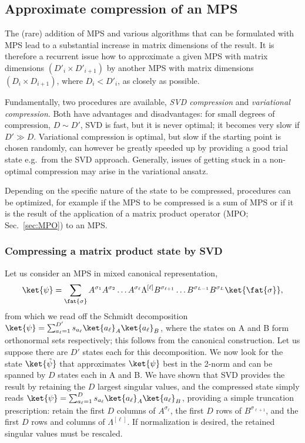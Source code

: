\subsection{Approximate compression of an MPS}

The (rare) addition of MPS and various algorithms that can be formulated with MPS lead to a substantial increase in matrix dimensions of the result. It is therefore a recurrent issue how to approximate a given MPS with matrix dimensions $(D'_i \times D'_{i+1})$ by another MPS with 
matrix dimensions $(D_i \times D_{i+1})$, where $D_i < D'_i$, as closely as possible. 

Fundamentally, two procedures are available, {\em SVD compression} and {\em variational compression}. Both have advantages and disadvantages: for small degrees of compression, $D \sim D'$, SVD is fast, but it is never optimal; it becomes very slow if $D' \gg D$. Variational compression is optimal, but slow if the starting point is chosen randomly, can however be greatly speeded up by providing a good trial state e.g.\ from the SVD approach. Generally, issues of getting stuck in a non-optimal compression may arise in the variational ansatz.
 
Depending on the specific nature of the state to be compressed, procedures can be optimized, for example if the MPS to be compressed is a sum of MPS or if it is the result of the application of a matrix product operator (MPO; Sec.\ \ref{sec:MPO}) to an MPS.

\subsubsection{Compressing a matrix product state by SVD}
Let us consider an MPS in mixed canonical representation,
\begin{equation}
\ket{\psi} = \sum_{\fat{\sigma}} A^{\sigma_1} A^{\sigma_2} \ldots A^{\sigma_{\ell}} \Lambda^{[\ell]} B^{\sigma_{\ell+1}} \ldots B^{\sigma_{L-1}} B^{\sigma_L}  \ket{\fat{\sigma}} ,
\label{eq:compressionstart}
\end{equation}
from which we read off the Schmidt decomposition $\ket{\psi} = \sum_{a_\ell=1}^{D'} s_{a_\ell} \ket{a_\ell}_A \ket{a_\ell}_B$, where the states on A and B form orthonormal sets respectively; this follows from the canonical construction. Let us suppose there are $D'$ states each for this decomposition. We now look for the state $\ket{\tilde{\psi}}$ that approximates $\ket{\psi}$ best in the 2-norm and can be spanned by $D$ states each in A and B. We have shown that SVD provides the result by retaining the $D$ largest singular values, and the compressed state simply reads $\ket{\psi} = \sum_{a_\ell=1}^{D} s_{a_\ell} \ket{a_\ell}_A \ket{a_\ell}_B$, providing a simple truncation prescription: retain the first $D$ columns of $A^{\sigma_{\ell}}$, the first $D$ rows of  $B^{\sigma_{\ell+1}}$, and the first $D$ rows and columns of  $\Lambda^{[\ell]}$. If normalization is desired, the retained singular values must be rescaled.

